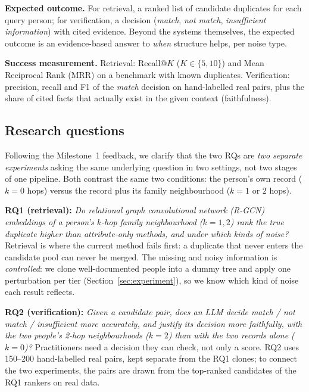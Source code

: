 \textbf{Expected outcome.} For retrieval, a ranked list of candidate duplicates for each query person; for verification, a decision (\textit{match}, \textit{not match}, \textit{insufficient information}) with cited evidence. Beyond the systems themselves, the expected outcome is an evidence-based answer to \emph{when} structure helps, per noise type.

\textbf{Success measurement.} Retrieval: Recall@$K$ ($K\in\{5,10\}$) and Mean Reciprocal Rank (MRR) on a benchmark with known duplicates. Verification: precision, recall and F1 of the \textit{match} decision on hand-labelled real pairs, plus the share of cited facts that actually exist in the given context (faithfulness).

\subsection*{Research questions}
Following the Milestone~1 feedback, we clarify that the two RQs are \emph{two separate experiments} asking the same underlying question in two settings, not two stages of one pipeline. Both contrast the same two conditions: the person's own record ($k=0$ hops) versus the record plus its family neighbourhood ($k=1$ or $2$ hops).

\textbf{RQ1 (retrieval):} \emph{Do relational graph convolutional network (R-GCN) embeddings of a person's $k$-hop family neighbourhood ($k=1,2$) rank the true duplicate higher than attribute-only methods, and under which kinds of noise?}
Retrieval is where the current method fails first: a duplicate that never enters the candidate pool can never be merged. The missing and noisy information is \emph{controlled}: we clone well-documented people into a dummy tree and apply one perturbation per tier (Section~\ref{sec:experiment}), so we know which kind of noise each result reflects.

\textbf{RQ2 (verification):} \emph{Given a candidate pair, does an LLM decide match / not match / insufficient more accurately, and justify its decision more faithfully, with the two people's 2-hop neighbourhoods ($k=2$) than with the two records alone ($k=0$)?}
Practitioners need a decision they can check, not only a score. RQ2 uses 150--200 hand-labelled real pairs, kept separate from the RQ1 clones; to connect the two experiments, the pairs are drawn from the top-ranked candidates of the RQ1 rankers on real data.
